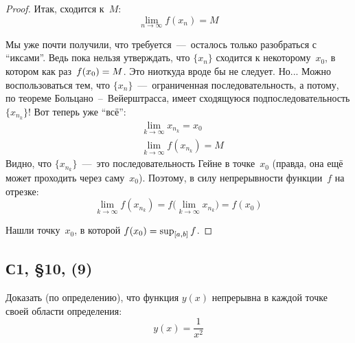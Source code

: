 \documentclass[a4paper,12pt]{article}
\begin{document}
\begin{proof}
      Итак, сходится к~$M$:
      \[
        \lim_{n \to \infty} f(x_n) = M
      \]

      Мы уже почти получили, что требуется~---~осталось только разобраться с ``иксами''.
      Ведь пока нельзя утверждать, что $\{x_n\}$ сходится к некоторому~$x_0$, в котором как раз~$f(x_0) \hm= M$.
      Это ниоткуда вроде бы не следует.
      Но...
      Можно воспользоваться тем, что $\{x_n\}$~---~ограниченная последовательность, а потому, по теореме Больцано~--~Вейерштрасса, имеет сходящуюся подпоследовательность $\{x_{n_k}\}$!
      Вот теперь уже ``всё'':
      \[
        \begin{aligned}
          &\lim_{k \to \infty} x_{n_k} = x_0\\
          &\lim_{k \to \infty} f(x_{n_k}) = M
        \end{aligned}
      \]
      Видно, что $\{x_{n_k}\}$~---~это последовательность Гейне в точке~$x_0$ (правда, она ещё может проходить через саму~$x_0$).
      Поэтому, в силу непрерывности функции~$f$ на отрезке:
      \[
        \lim_{k \to \infty} f(x_{n_k}) = f\bigl(\lim_{k \to \infty} x_{n_k}\bigr) = f(x_0)
      \]

      Нашли точку~$x_0$, в которой $f(x_0) \hm= \sup_{[a, b]} f$.
  \end{proof}


  \subsection{С1, \S 10, (9)}

  Доказать (по определению), что функция $y(x)$ непрерывна в каждой точке своей области определения:
  \[
    y(x) = \frac{1}{x^2}
  \]
  
\end{document}
